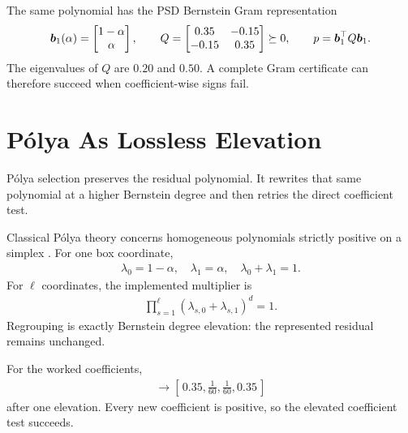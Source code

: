 The same polynomial has the PSD Bernstein Gram representation
\begin{gather*}
  \boldsymbol{b}_1(\alpha)=\begin{bmatrix}1-\alpha\\\alpha\end{bmatrix},\qquad
  Q=\begin{bmatrix}0.35&-0.15\\-0.15&0.35\end{bmatrix}\succeq0,
  \qquad p=\boldsymbol{b}_1^\top Q\boldsymbol{b}_1.
\end{gather*}
The eigenvalues of $Q$ are $0.20$ and $0.50$.  A complete Gram certificate can therefore succeed when coefficient-wise signs fail.

\section{P\'olya As Lossless Elevation}
\label{sec:certificate-polya}

P\'olya selection preserves the residual polynomial. It rewrites that same polynomial at a higher Bernstein degree and then retries the direct coefficient test.

Classical P\'olya theory concerns homogeneous polynomials strictly positive on a simplex \cite{powersreznick2001}. For one box coordinate,
\begin{gather*}
  \lambda_0=1-\alpha,\quad \lambda_1=\alpha,\quad
  \lambda_0+\lambda_1=1.
\end{gather*}
For $\ell$ coordinates, the implemented multiplier is
\begin{gather*}
  \prod_{s=1}^{\ell}
(\lambda_{s,0}+\lambda_{s,1})^d=1.
\end{gather*}
Regrouping is exactly Bernstein degree elevation: the represented residual remains unchanged.

For the worked coefficients,
\begin{gather*}
[\,0.35,-0.15,0.35\,]
  \longrightarrow
  \left[\,0.35,\frac1{60},\frac1{60},0.35\,\right]
\end{gather*}
after one elevation.  Every new coefficient is positive, so the elevated coefficient test succeeds.

\begin{center}
\end{center}

